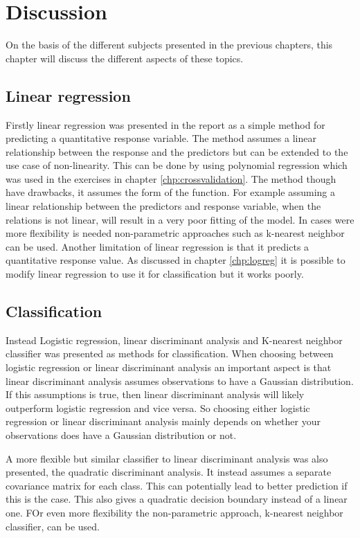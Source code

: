 \chapter{Discussion}
\label{chp:disc}
On the basis of the different subjects presented in the previous chapters, this chapter will discuss the different aspects of these  topics.

\section{Linear regression}

Firstly linear regression was presented in the report as a simple method for predicting a quantitative response variable. The method assumes a linear relationship between the response and the predictors but can be extended to the use case of non-linearity. This can be done by using polynomial regression which was used in the exercises in chapter \ref{chp:crossvalidation}. The method though have drawbacks, it assumes the form of the function. For example assuming a linear relationship between the predictors and response variable, when the relations is not linear, will result in a very poor fitting of the model. In cases were more flexibility is needed non-parametric approaches such as k-nearest neighbor can be used. Another limitation of linear regression is that it predicts a quantitative response value. As discussed in chapter \ref{chp:logreg} it is possible to modify linear regression to use it for classification but it works poorly.

\section{Classification}

Instead Logistic regression, linear discriminant analysis and K-nearest neighbor classifier was presented as methods for classification. When choosing between logistic regression or linear discriminant analysis an important aspect is that linear discriminant analysis assumes observations to have a Gaussian distribution. If this assumptions is true, then linear discriminant analysis will likely outperform logistic regression and vice versa. So choosing either logistic regression or linear discriminant analysis mainly depends on whether your observations does have a Gaussian distribution or not. 
 
A more flexible but similar classifier to linear discriminant analysis was also presented, the quadratic discriminant analysis. It instead assumes a separate covariance matrix for each class. This can potentially lead to better prediction if this is the case. This also gives a quadratic decision boundary instead of a linear one. FOr even more flexibility the non-parametric approach, k-nearest neighbor classifier, can be used.

